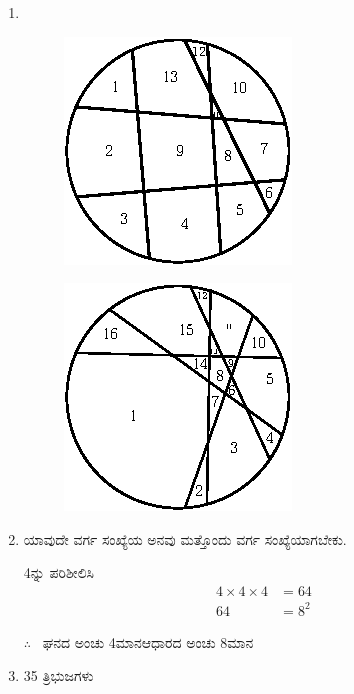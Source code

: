 \begin{enumerate}
\item 
~

\begin{minipage}[c]{4cm}
\begin{figure}[H]
\centering
\includegraphics{images/chap4/ans23a.eps}
\end{figure}
\end{minipage}
\begin{minipage}[c]{4cm}
\begin{figure}[H]
\centering
\includegraphics{images/chap4/ans23b.eps}
\end{figure}
\end{minipage}

\item ಯಾವುದೇ ವರ್ಗ ಸಂಖ್ಯೆಯ ಅನವು ಮತ್ತೊಂದು ವರ್ಗ ಸಂಖ್ಯೆಯಾಗಬೇಕು.

4ನ್ನು ಪರಿಶೀಲಿಸಿ
\begin{align*}
4\times4\times4 & = 64\\
64 &= 8^{2}
\end{align*}

$\therefore$~ ಘನದ ಅಂಚು 4ಮಾನ\quad ಆಧಾರದ ಅಂಚು 8ಮಾನ

\item 35 ತ್ರಿಭುಜಗಳು


\end{enumerate}

